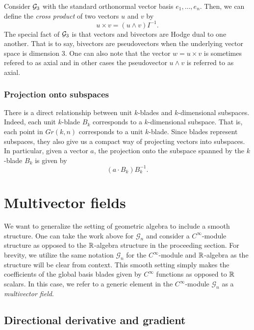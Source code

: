 \documentclass[12pt]{article}
\begin{document}


\begin{example}
Consider $\mathcal{G}_3$ with the standard orthonormal vector basis $e_1,\dots,e_n$.  Then, we can define the \emph{cross product} of two vectors $u$ and $v$ by
\[
u \times v = (u\wedge v)I^{-1}.
\]
The special fact of $\mathcal{G}_3$ is that vectors and bivectors are Hodge dual to one another. That is to say, bivectors are pseudovectors when the underlying vector space is dimension 3. One can also note that the vector $w=u\times v$ is sometimes refered to as axial and in other cases the pseudovector $u\wedge v$ is referred to as axial.  
\end{example}

\subsubsection{Projection onto subspaces}

There is a direct relationship between unit $k$-blades and $k$-dimensional subspaces.  Indeed, each unit $k$-blade $B_k$ corresponds to a $k$-dimensional subspace.  That is, each point in $Gr(k,n)$ corresponds to a unit $k$-blade.  Since blades represent subspaces, they also give us a compact way of projecting vectors into subspaces.  In particular, given a vector $a$, the projection onto the subspace spanned by the $k$-blade $B_k$ is given by
\[
(a\cdot B_k)B_k^{-1}.
\]


\section{Multivector fields}

We want to generalize the setting of geometric algebra to include a smooth structure. One can take the work above for $\mathcal{G}_n$ and consider a $C^{\infty}$-module structure as opposed to the $\mathbb{R}$-algebra structure in the proceeding section. For brevity, we utilize the same notation $\mathcal{G}_n$ for the $C^\infty$-module and $\mathbb{R}$-algebra as the structure will be clear from context. This smooth setting simply makes the coefficients of the global basis blades given by $C^\infty$ functions as opposed to $\mathbb{R}$ scalars.  In this case, we refer to a generic element in the $C^{\infty}$-module $\mathcal{G}_n$ as a \emph{multivector field}.

\subsection{Directional derivative and gradient}
\end{document}
